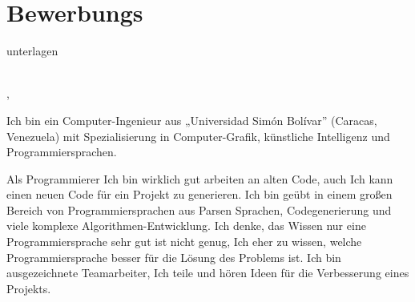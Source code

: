 \documentclass[11pt,a4paper,roman]{moderncv}
\begin{document}


\makeatletter
{}
\pagestyle{empty}

\chapter*{Bewerbungs}{unterlagen}

\vspace*{40mm}
\begin{minipage}{\textwidth}
	\vspace*{3mm}
	\familynamestyle{\@firstname}~~\firstnamestyle{\@familyname} 	
	\\[3mm]
	\@addressstreet, \@addresscity ~~~ \mobilesymbol~\@mobile ~~~ \emailsymbol~\@email
\end{minipage}
\begin{minipage}{70pt}

\vspace*{10mm}

\end{minipage}

Ich bin ein Computer-Ingenieur aus „Universidad Simón Bolívar” (Caracas, 
Venezuela) mit Spezialisierung in Computer-Grafik, künstliche Intelligenz und 
Programmiersprachen.

\vspace*{2mm}

Als Programmierer Ich bin wirklich gut arbeiten an alten Code, auch Ich kann 
einen neuen Code für ein Projekt zu generieren. Ich bin geübt in einem großen 
Bereich von Programmiersprachen aus Parsen Sprachen, Codegenerierung und viele 
komplexe Algorithmen-Entwicklung. Ich denke, das Wissen nur eine 
Programmiersprache sehr gut ist nicht genug, Ich eher zu wissen, welche 
Programmiersprache besser für die Lösung des Problems ist. Ich bin 
ausgezeichnete Teamarbeiter, Ich teile und hören Ideen für die Verbesserung 
eines Projekts. 
\end{document}

